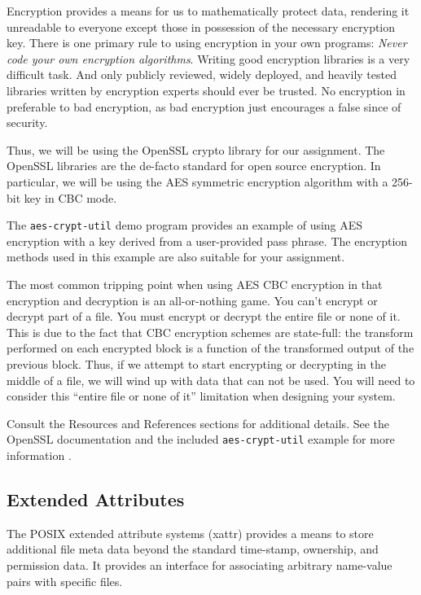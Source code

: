 \documentclass[12pt]{article}
\begin{document}
Encryption provides a means for us to mathematically protect data,
rendering it unreadable to everyone except those in possession of the
necessary encryption key. There is one primary rule to using
encryption in your own programs: \emph{Never code your own encryption
 algorithms}. Writing good encryption libraries is a very difficult
task. And only publicly reviewed, widely deployed, and heavily tested
libraries written by encryption experts should ever be trusted. No
encryption in preferable to bad encryption, as bad encryption just
encourages a false since of security.

Thus, we will be using the OpenSSL\cite{openssl-website} crypto
library\cite{openssl-evp} for our
assignment. The OpenSSL libraries are the de-facto standard for open
source encryption. In particular, we will be using the AES symmetric
encryption algorithm with a 256-bit key in CBC mode.

The \texttt{aes-crypt-util} demo program provides an example of using
AES encryption with a key derived from a user-provided pass phrase. The
encryption methods used in this example are also suitable for your
assignment.

The most common tripping point when using AES CBC
encryption in that encryption and decryption is an all-or-nothing
game. You can't encrypt or decrypt part of a file. You must encrypt or
decrypt the entire file or none of it. This is due to the fact that CBC
encryption schemes are state-full: the transform performed on each
encrypted block is a function of the transformed output of the previous
block. Thus, if we attempt to start encrypting or decrypting in
the middle of a file, we will wind up with data that can not be
used. You will need to consider this ``entire file or none of it''
limitation when designing your system.

Consult the Resources and References sections for additional
details. See the OpenSSL documentation and the included
\texttt{aes-crypt-util} example for more information
\cite{openssl-website,openssl-docs,openssl-evp,pillai-aes}.

\subsection{Extended Attributes}

The POSIX extended attribute systems (xattr) provides a means to
store additional file meta data beyond the standard time-stamp,
ownership, and permission data. It provides an interface for
associating arbitrary name-value pairs with specific files.
\end{document}
